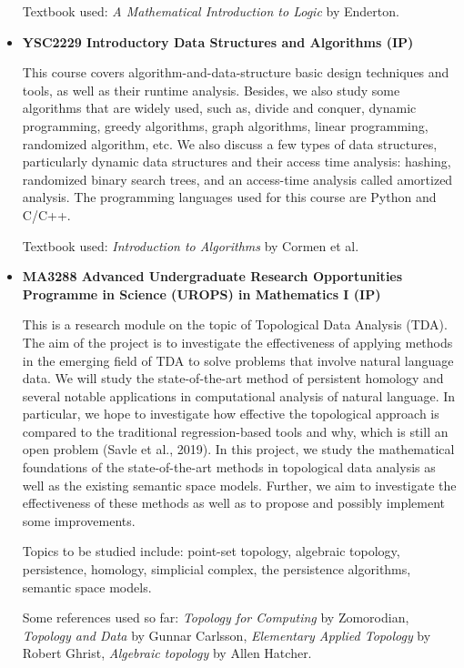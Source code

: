 \documentclass[11pt,reqno,oneside,a4paper]{article}
\begin{document}
\begin{itemize}
		\par Textbook used: \textit{A Mathematical Introduction to Logic} by Enderton.
		
		\item \textbf{YSC2229 Introductory Data Structures and Algorithms (IP) }
		
		\par This course covers algorithm-and-data-structure basic design techniques and tools, as well as their runtime analysis. Besides, we also study some algorithms that are widely used, such as, divide and conquer, dynamic programming, greedy algorithms, graph algorithms, linear programming, randomized algorithm, etc. We also discuss a few types of data structures, particularly dynamic data structures and their access time analysis: hashing, randomized binary search trees, and an access-time analysis called amortized analysis. The programming languages used for this course are Python and C/C++.
		
		
		\par Textbook used: \textit{Introduction to Algorithms }by Cormen et al.
		
		\item \textbf{MA3288 Advanced Undergraduate Research Opportunities Programme in Science (UROPS) in Mathematics I (IP)}
		
		\par This is a research module on the topic of Topological Data Analysis (TDA). The aim of the project is to investigate the effectiveness of applying methods in the emerging field of TDA to solve problems that involve natural language data. We will study the state-of-the-art method of persistent homology and several notable applications in computational analysis of natural language. In particular, we hope to investigate how effective the topological approach is compared to the traditional regression-based tools and why, which is still an open problem (Savle et al., 2019). In this project, we study the mathematical foundations of the state-of-the-art methods in topological data analysis as well as the existing semantic space models. Further, we aim to investigate the effectiveness of these methods as well as to propose and possibly implement some improvements. 
		
		\par Topics to be studied include: point-set topology, algebraic topology, persistence, homology, simplicial  complex, the persistence algorithms, semantic space models.
		
		\par Some references used so far: \textit{Topology for Computing} by Zomorodian,\textit{ Topology and Data} by Gunnar Carlsson, \textit{Elementary Applied Topology} by Robert Ghrist, \textit{Algebraic topology} by Allen Hatcher.
		

\end{itemize}
\end{document}
